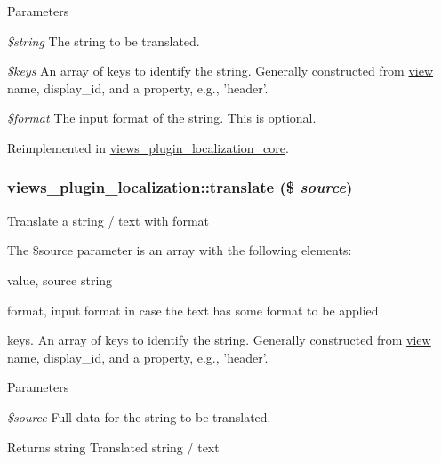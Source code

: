 \begin{DoxyParams}{Parameters}
\item[{\em \$string}]The string to be translated. \item[{\em \$keys}]An array of keys to identify the string. Generally constructed from \hyperlink{classview}{view} name, display\_\-id, and a property, e.g., 'header'. \item[{\em \$format}]The input format of the string. This is optional. \end{DoxyParams}


Reimplemented in \hyperlink{classviews__plugin__localization__core_a6d21acdb67193321115f053762f82e35}{views\_\-plugin\_\-localization\_\-core}.\hypertarget{classviews__plugin__localization_a56b08b27d30b9061c3c9a51993fe4159}{
\subsubsection[{translate}]{\setlength{\rightskip}{0pt plus 5cm}views\_\-plugin\_\-localization::translate (\$ {\em source})}}
\label{classviews__plugin__localization_a56b08b27d30b9061c3c9a51993fe4159}
Translate a string / text with format

The \$source parameter is an array with the following elements:
\begin{DoxyItemize}
\item value, source string
\item format, input format in case the text has some format to be applied
\item keys. An array of keys to identify the string. Generally constructed from \hyperlink{classview}{view} name, display\_\-id, and a property, e.g., 'header'.
\end{DoxyItemize}


\begin{DoxyParams}{Parameters}
\item[{\em \$source}]Full data for the string to be translated.\end{DoxyParams}
\begin{DoxyReturn}{Returns}
string Translated string / text 
\end{DoxyReturn}


